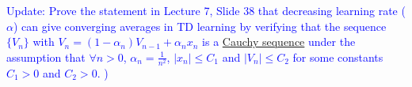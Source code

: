 \documentclass{article}
\newcommand{\mytextcolor}[1]{\textcolor{blue}{{}#1}}
\begin{document}
\begin{enumerate}
\begin{enumerate}
    	    \mytextcolor{Update: 
    	     Prove the statement in Lecture 7, Slide 38 that decreasing learning rate ($\alpha$) can give converging averages in TD learning by verifying that the sequence $\{V_n\}$ with $V_n=(1-\alpha_n)V_{n-1}+\alpha_n x_n$ is a \href{https://en.wikipedia.org/wiki/Cauchy_sequence}{Cauchy sequence}
    	    under the assumption that $\forall n>0$, $\alpha_n=\frac{1}{n^2}$, $|x_n|\leq C_1$ and $|V_n|\leq C_2$ for some constants $C_1>0$ and $C_2>0$. )
    	    }
    \end{enumerate}



\end{enumerate}
\end{document}
